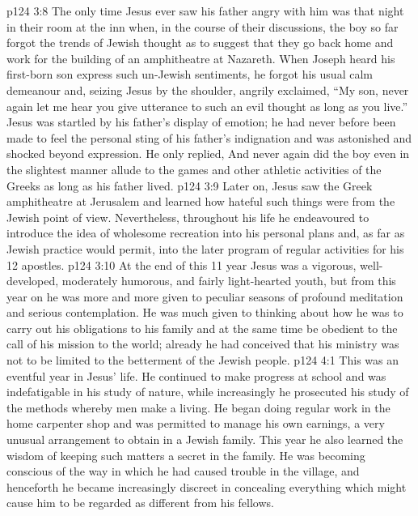 \vs p124 3:8 The only time Jesus ever saw his father angry with him was that night in their room at the inn when, in the course of their discussions, the boy so far forgot the trends of Jewish thought as to suggest that they go back home and work for the building of an amphitheatre at Nazareth. When Joseph heard his first\hyp{}born son express such un\hyp{}Jewish sentiments, he forgot his usual calm demeanour and, seizing Jesus by the shoulder, angrily exclaimed, “My son, never again let me hear you give utterance to such an evil thought as long as you live.” Jesus was startled by his father’s display of emotion; he had never before been made to feel the personal sting of his father’s indignation and was astonished and shocked beyond expression. He only replied,  And never again did the boy even in the slightest manner allude to the games and other athletic activities of the Greeks as long as his father lived.
\vs p124 3:9 Later on, Jesus saw the Greek amphitheatre at Jerusalem and learned how hateful such things were from the Jewish point of view. Nevertheless, throughout his life he endeavoured to introduce the idea of wholesome recreation into his personal plans and, as far as Jewish practice would permit, into the later program of regular activities for his 12 apostles.
\vs p124 3:10 At the end of this 11 year Jesus was a vigorous, well\hyp{}developed, moderately humorous, and fairly light\hyp{}hearted youth, but from this year on he was more and more given to peculiar seasons of profound meditation and serious contemplation. He was much given to thinking about how he was to carry out his obligations to his family and at the same time be obedient to the call of his mission to the world; already he had conceived that his ministry was not to be limited to the betterment of the Jewish people.
\vs p124 4:1 This was an eventful year in Jesus’ life. He continued to make progress at school and was indefatigable in his study of nature, while increasingly he prosecuted his study of the methods whereby men make a living. He began doing regular work in the home carpenter shop and was permitted to manage his own earnings, a very unusual arrangement to obtain in a Jewish family. This year he also learned the wisdom of keeping such matters a secret in the family. He was becoming conscious of the way in which he had caused trouble in the village, and henceforth he became increasingly discreet in concealing everything which might cause him to be regarded as different from his fellows.

